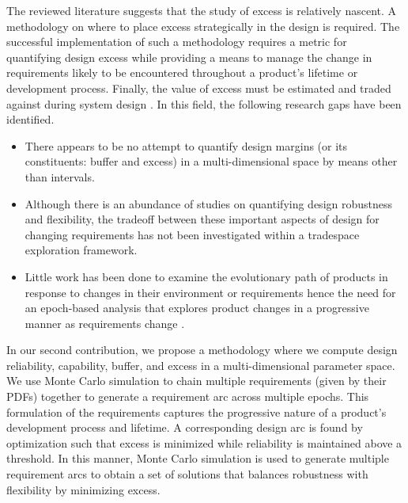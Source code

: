 
The reviewed literature suggests that the study of excess is relatively nascent. A methodology on where to place excess strategically in the design is required. The successful implementation of such a methodology requires a metric for quantifying  design excess while providing a means to manage the change in requirements likely to be encountered throughout a product's lifetime or development process. Finally, the value of excess must be estimated and traded against during system design \cite{Long2017}. In this field, the following research gaps have been identified.

\begin{itemize}
	\item There appears to be no attempt to quantify design margins (or its constituents: buffer and excess) in a multi-dimensional space by means other than intervals. 
	\item Although there is an abundance of studies on quantifying design robustness and flexibility, the tradeoff between these important aspects of design for changing requirements has not been investigated within a tradespace exploration framework. 
	\item Little work has been done to examine the evolutionary path of products in response to changes in their environment or requirements hence the need for an epoch-based analysis that explores product changes in a progressive manner as requirements change \cite{Long2017,Cardin2017}.
\end{itemize}

In our second contribution, we propose a methodology where we compute design reliability, capability, buffer, and excess  in a multi-dimensional parameter space. We use Monte Carlo simulation to chain multiple requirements (given by their \acp{PDF}) together to generate a requirement arc across multiple epochs. This formulation of the requirements captures the progressive nature of a product's development process and lifetime. A corresponding design arc is found by optimization such that excess is minimized while reliability is maintained above a threshold. In this manner, Monte Carlo simulation is used to generate multiple requirement arcs to obtain a set of solutions that balances robustness with flexibility by minimizing excess.

